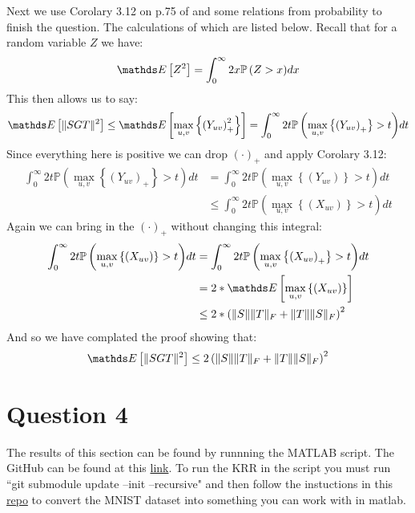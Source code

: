 Next we use Corolary 3.12 on p.75 of \cite{Ledoux2011Probability} and some relations from probability to finish the question. The calculations of which
are listed below. Recall that for a random variable $Z$ we have:
\begin{equation*}
    \pexp{Z^2} = \int_{0}^{\infty}{2x\mathbb{P}\left(Z > x \right)} dx
\end{equation*}
This then allows us to say:
\begin{align*}
    \pexp{\norm{SGT}^2} \leq \pexp{\underset{u,v}{\max}\left\{ \left(Y_{uv}\right)_{+}^2 \right \}} = \int_{0}^{\infty}{2t\mathbb{P}\left(\underset{u,v}{\max}\left\{ \left(Y_{uv}\right)_{+} \right\} > t \right)} dt 
\end{align*}
Since everything here is positive we can drop $(\cdot)_{+}$ and apply Corolary 3.12:
\begin{align*}
    \int_{0}^{\infty}{2t\mathbb{P}\left(\underset{u,v}{\max}\left\{ \left(Y_{uv}\right)_{+} \right\} > t \right)} dt  &= \int_{0}^{\infty}{2t\mathbb{P}\left(\underset{u,v}{\max}\left\{ \left(Y_{uv}\right) \right\} > t \right)} dt \\
                                                                                                                    &\leq \int_{0}^{\infty}{2t\mathbb{P}\left(\underset{u,v}{\max}\left\{ \left(X_{uv}\right) \right\} > t \right)} dt 
\end{align*}
Again we can bring in the $(\cdot)_{+}$ without changing this integral:
\begin{align*}
    \int_{0}^{\infty}{2t\mathbb{P}\left(\underset{u,v}{\max}\left\{ \left(X_{uv}\right) \right\} > t \right)} dt &= \int_{0}^{\infty}{2t\mathbb{P}\left(\underset{u,v}{\max}\left\{ \left(X_{uv}\right)_{+} \right\} > t \right)} dt \\
                                                                                                               &= 2*\pexp{\underset{u,v}{\max}\left\{(X_{uv})\right\}} \\
                                                                                                               &\leq  2*\left( \norm{S}\norm{T}_F +\norm{T}\norm{S}_F\right)^2
\end{align*}
And so we have complated the proof showing that:
\begin{equation*}
    \pexp{\norm{SGT}^2} \leq 2\left( \norm{S}\norm{T}_F +\norm{T}\norm{S}_F\right)^2
\end{equation*}

\section{Question 4}
The results of this section can be found by runnning the MATLAB script. The GitHub can be found at this
\href{https://github.com/AaronDinesh/MATH-403/tree/master/final_project}{link}. To run the KRR in the script you must run
``git submodule update --init --recursive" and then follow the instuctions in this
\href{https://github.com/sunsided/mnist-matlab/tree/9fd29f6c632d3f715ac484ab30ccfa4bcd04dbef}{repo} to convert the MNIST
dataset into something you can work with in matlab.